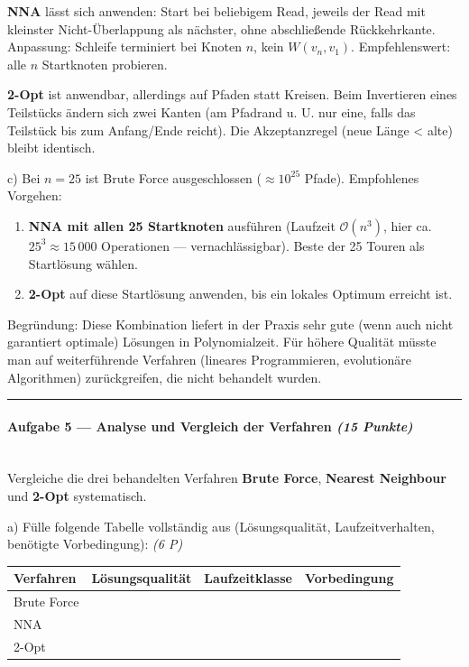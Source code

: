 \documentclass[11pt, a4paper]{article}
\begin{document}
\textbf{NNA} lässt sich anwenden: Start bei beliebigem Read, jeweils der Read mit kleinster Nicht-Überlappung als nächster, ohne abschließende Rückkehrkante. Anpassung: Schleife terminiert bei Knoten $n$, kein $W(v_n,v_1)$. Empfehlenswert: alle $n$ Startknoten probieren.


\textbf{2-Opt} ist anwendbar, allerdings auf Pfaden statt Kreisen. Beim Invertieren eines Teilstücks ändern sich zwei Kanten (am Pfadrand u. U. nur eine, falls das Teilstück bis zum Anfang/Ende reicht). Die Akzeptanzregel (neue Länge < alte) bleibt identisch.


c) Bei $n=25$ ist Brute Force ausgeschlossen ($\approx 10^{25}$ Pfade). Empfohlenes Vorgehen:


\begin{enumerate}
  \item \textbf{NNA mit allen 25 Startknoten} ausführen (Laufzeit $\mathcal{O}(n^3)$, hier ca. $25^3 \approx 15\,000$ Operationen — vernachlässigbar). Beste der 25 Touren als Startlösung wählen.
  \item \textbf{2-Opt} auf diese Startlösung anwenden, bis ein lokales Optimum erreicht ist.
\end{enumerate}

Begründung: Diese Kombination liefert in der Praxis sehr gute (wenn auch nicht garantiert optimale) Lösungen in Polynomialzeit. Für höhere Qualität müsste man auf weiterführende Verfahren (lineares Programmieren, evolutionäre Algorithmen) zurückgreifen, die nicht behandelt wurden.



\noindent\textcolor{rulegray}{\rule{\linewidth}{0.4pt}}


\paragraph{Aufgabe 5 — Analyse und Vergleich der Verfahren \textit{(15 Punkte)}}\mbox{}\\[2pt]

Vergleiche die drei behandelten Verfahren \textbf{Brute Force}, \textbf{Nearest Neighbour} und \textbf{2-Opt} systematisch.


a) Fülle folgende Tabelle vollständig aus (Lösungsqualität, Laufzeitverhalten, benötigte Vorbedingung): \textit{(6 P)}



{\small
\begin{tabularx}{\linewidth}{XXXX}
\hline
\rowcolor{tableheadbg}
{\color{white}\textbf{Verfahren}} & {\color{white}\textbf{Lösungsqualität}} & {\color{white}\textbf{Laufzeitklasse}} & {\color{white}\textbf{Vorbedingung}} \\[2pt]
\hline
\endhead
\hline
\endfoot
Brute Force &  &  &  \\
NNA &  &  &  \\
2-Opt &  &  &  \\
\end{tabularx}
}
\end{document}
